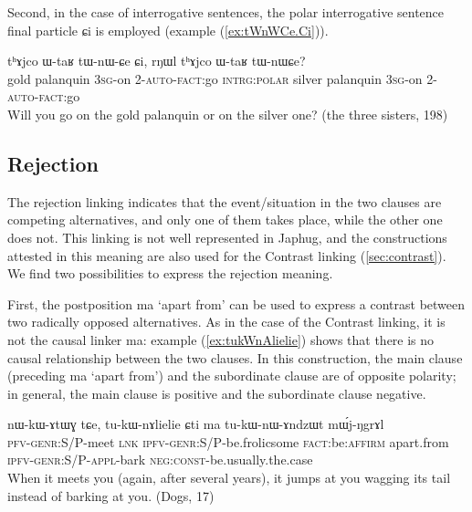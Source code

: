 \documentclass[oldfontcommands,oneside,a4paper,11pt]{article}
\newcommand{\ipa}[1]{{\phon \mbox{#1}}} %
\newcommand{\refb}[1]{(\ref{#1})}
\begin{document}
Second, in the case of interrogative sentences, the polar interrogative sentence final particle \ipa{ɕi} is employed (example \refb{ex:tWnWCe.Ci}).

\begin{exe}
\ex \label{ex:tWnWCe.Ci}
\gll \ipa{χsɤr}    	\ipa{tʰɤjco}    	\ipa{ɯ-taʁ}    	\ipa{tɯ-nɯ-ɕe}    	\ipa{ɕi,}    	\ipa{rŋɯl}    	\ipa{tʰɤjco}    	\ipa{ɯ-taʁ}    	\ipa{tɯ-nɯɕe?}    	\\
gold palanquin \textsc{3sg}-on \textsc{2-auto-fact}:go \textsc{intrg:polar} silver palanquin \textsc{3sg}-on \textsc{2-auto-fact}:go \\
\glt Will you go on the gold palanquin or on the silver one? (the three sisters, 198)
 \end{exe}
 
\subsection{Rejection} \label{sec:rejection}

The rejection linking indicates that the event/situation in the two clauses are competing alternatives, and only one of them takes place, while the other one  does not. This linking is not well represented in Japhug, and the constructions attested in this meaning are also used for the Contrast linking \refb{sec:contrast}. We find two possibilities to express the rejection meaning.

First, the postposition \ipa{ma} `apart from'  can be used to express a contrast between two radically opposed alternatives.  As in the case of the Contrast linking, it is not the causal linker \ipa{ma}: example \refb{ex:tukWnAlielie} shows that there is no causal relationship between the two clauses. In this construction, the main clause (preceding  \ipa{ma} `apart from') and the subordinate clause are of opposite polarity; in general, the main clause is positive and the subordinate clause negative.



\begin{exe}
\ex \label{ex:tukWnAlielie}
\gll
\ipa{nɯ-kɯ-ɤtɯɣ}  	\ipa{tɕe,}  	\ipa{tu-kɯ-nɤlielie}  	\ipa{ɕti}  	\ipa{ma}  	\ipa{tu-kɯ-nɯ-ɤndzɯt}  	\ipa{mɯ́j-ŋgrɤl}  	\\
\textsc{pfv-genr:S/P}-meet \textsc{lnk} \textsc{ipfv-genr:S/P}-be.frolicsome \textsc{fact}:be:\textsc{affirm}  apart.from \textsc{ipfv-genr:S/P}-\textsc{appl}-bark \textsc{neg:const}-be.usually.the.case \\
\glt When it meets you (again, after several years), it jumps at you wagging its tail instead of barking at you.  (Dogs, 17)
\end{exe}
 
\end{document}
